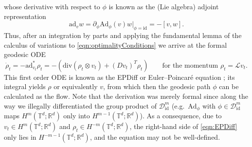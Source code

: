 \documentclass[a4paper, 12pt]{article}
\newcommand{\R}{\mathbb{R}}
\newcommand{\T}{\mathbb{T}}
\renewcommand{\div}{\mathrm{div}}
\newcommand{\id}{\mathrm{id}}
\newcommand{\DiffSobId}{\mathcal D_{\id}}
\renewcommand{\L}{\mathcal{L}}
\newcommand{\adjointMap}{\mathrm{Ad}}
\newcommand{\adjointDer}{\mathrm{ad}}
\begin{document}
whose derivative with respect to $\phi$ is known as the (Lie algebra) adjoint representation
\begin{equation*}
\adjointDer_vw=\partial_\phi\adjointMap_\phi(v)w|_{\phi=\id}=-[v,w].
\end{equation*}
Thus, after an integration by parts and applying the fundamental lemma of the calculus of variations to \eqref{eqn:optimalityConditions} we arrive at the formal geodesic ODE
\begin{equation}\label{eqn:EPDiff}
\dot\rho_t
=-\adjointDer_{v_t}^*\rho_t
=-(\div(\rho_t\otimes v_t)+(Dv_t)^T\rho_t)
\qquad\text{for the momentum }
\rho_t=\L v_t.
\end{equation}
This first order ODE is known as the EPDiff or Euler--Poincar\'e equation \cite{TrYo15};
its integral yields $\rho$ or equivalently $v$, from which then the geodesic path $\phi$ can be calculated as the flow.
Note that the derivation was merely formal since along the way we illegally differentiated the group product of $\DiffSobId^m$
(e.g.\ $\adjointMap_\phi$ with $\phi\in\DiffSobId^m$ maps $H^m(\T^d;\R^d)$ only into $H^{m-1}(\T^d;\R^d)$).
As a consequence, due to $v_t\in H^m(\T^d;\R^d)$ and $\rho_t\in H^{-m}(\T^d;\R^d)$, the right-hand side of \eqref{eqn:EPDiff} only lies in $H^{-m-1}(\T^d;\R^d)$, and the equation may not be well-defined.
\end{document}
